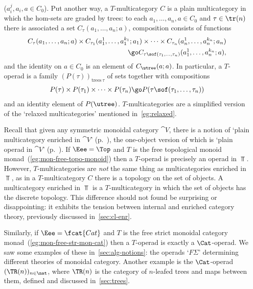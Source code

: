 \begin{example}
%
($a_i^j, a_i, a \in C_0$).  Put another way, a $T$-multicategory $C$ is
a plain multicategory in which the hom-sets are graded by trees: to each $a_1,
\ldots, a_n, a \in C_0$ and $\tau \in \tr(n)$ there is associated a set
$C_\tau(a_1, \ldots, a_n; a)$, composition consists of functions 
% 
\begin{eqnarray*}
C_\tau(a_1, \ldots, a_n; a)
\times
C_{\tau_1}(a_1^1, \ldots, a_1^{k_1}; a_1)
\times\cdots\times
C_{\tau_n}(a_n^1, \ldots, a_n^{k_n}; a_n)\\
\go
C_{\tau\sof(\tau_1, \ldots, \tau_n)}(a_1^1, \ldots, a_n^{k_n}; a),
\end{eqnarray*}
% 
and the identity on $a\in C_0$ is an element of $C_\utree(a;a)$.  In
particular, a $T$-operad is a family $(P(\tau))_{\mathrm{trees\ }\tau}$ of
sets together with compositions
\[
P(\tau) \times P(\tau_1) \times\cdots\times P(\tau_n) 
\go
P(\tau\sof(\tau_1, \ldots, \tau_n))
\]
and an identity element of $P(\utree)$.  
% 
$T$-multicategories are a simplified version of the `relaxed%
%
%
%
%
multicategories' mentioned in~\ref{eg:relaxed}.
\end{example}

\begin{example}	
Recall that given any symmetric monoidal category $\cat{V}$, there is a
notion of `plain multicategory enriched%
%
%
in $\cat{V}$'
(p.~\pageref{p:sym-enr-mti}), the one-object version of which is `plain
operad in $\cat{V}$' (p.~\pageref{p:defn-V-Operad}).  If $\Eee=\Top$ and
$T$ is the free topological%
%
%
monoid monad~(\ref{eg:mon-free-topo-monoid})
then a $T$-operad is precisely an operad in $\Top$.%
%
%
 However,
$T$-multicategories are \emph{not} the same thing as multicategories
enriched in $\Top$, as in a $T$-multicategory $C$ there is a topology on
the set of objects.  A multicategory enriched in $\Top$ is a
$T$-multicategory in which the set of objects has the discrete topology.
This difference should not found be surprising or disappointing: it
exhibits the tension between internal%
%
%
%
%
and enriched category theory,
previously discussed in~\ref{sec:cl-enr}.
\end{example}

\begin{example}	
Similarly, if $\Eee=\fcat{Cat}$ and $T$ is the free strict monoidal
category monad~(\ref{eg:mon-free-str-mon-cat}) then a $T$-operad is exactly
a $\Cat$-operad.%
%
%
 We saw some examples of these in~\ref{sec:alg-notions}:
the operads `$F\Sigma$' determining different theories of monoidal
category.  Another example is the $\Cat$-operad $(\TR(n))_{n\in\nat}$,
where $\TR(n)$ is the category of $n$-leafed trees and maps between them,
defined and discussed in~\ref{sec:trees}.
\end{example}

